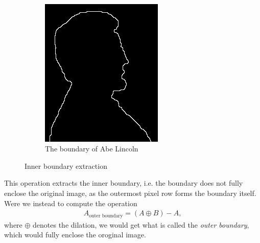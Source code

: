\documentclass[]{article}
\begin{document}
\begin{figure}[H]
\begin{subfigure}{0.5\textwidth}
    \end{subfigure}%
    ~
    \begin{subfigure}{0.5\textwidth}
        \centering
        \includegraphics[width=\textwidth]{img/lincoln-boundary}
        \caption{The boundary of Abe Lincoln}
        \label{fig:abe_after}
    \end{subfigure}%
    \caption{Inner boundary extraction}
    \label{fig:binary_morph}
\end{figure}
This operation extracts the inner boundary, i.e. the boundary does not fully enclose the original image, as the outermost pixel row forms the boundary itself. Were we instead to compute the operation
\begin{equation}\begin{aligned}
A_{\text{outer boundary}} = (A \oplus B) - A,
\end{aligned}\end{equation}
where $\oplus$ denotes the dilation, we would get what is called the \textit{outer boundary}, which would fully enclose the oroginal image.
\end{document}

